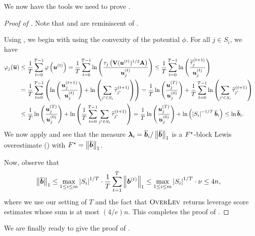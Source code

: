 \documentclass[11pt]{article}
\numberwithin{equation}{section}
\begin{document}
We now have the tools we need to prove .

\begin{proof}[Proof of ]
Note that  and  are reminiscent of \cite[Algorithm 2 and Theorem 4]{jls22}.

Using , we begin with using the convexity of the potential $\phi$. For all $j \in S_i$, we have
\begin{align*}
    \varphi_j(\overline{\bm{u}}) &\le \frac{1}{T}\sum_{t=0}^{T-1} \varphi\left(\bm{u}^{(t)}\right) = \frac{1}{T}\sum_{t=0}^{T-1} \ln\left(\frac{\tau_j\left(\mathbf{V}(\bm{u}^{(t)})^{1/2}\mathbf{A}\right)}{\bm{u}_j^{(t)}}\right) \le \frac{1}{T}\sum_{t=0}^{T-1}\ln\left(\frac{\widetilde{\tau}_j^{(t+1)}}{\bm{u}_j^{(t)}}\right) \\
    &= \frac{1}{T}\sum_{t=0}^{T-1}\left(\ln\left(\frac{\bm{u}_j^{(t+1)}}{\bm{u}_j^{(t)}}\right) + \ln\left(\sum_{j' \in S_i} \widetilde{\tau}_{j'}^{(t+1)}\right)\right) = \frac{1}{T}\ln\left(\frac{\bm{u}_j^{(T)}}{\bm{u}_j^{(0)}}\right) + \frac{1}{T}\sum_{t=0}^{T-1}\ln\left(\sum_{j' \in S_i} \widetilde{\tau}_{j'}^{(t+1)}\right) \\
    &\le \frac{1}{T}\ln\left(\frac{\bm{u}_j^{(T)}}{\bm{u}_j^{(0)}}\right) + \ln\left(\frac{1}{T}\sum_{t=0}^{T-1}\sum_{j' \in S_i} \widetilde{\tau}_{j'}^{(t+1)}\right) = \frac{1}{T}\ln\left(\frac{\bm{u}_j^{(T)}}{\bm{u}_j^{(0)}}\right) + \ln\left(\left\lvert S_i \right\rvert^{-1/T}\overline{\bm{b}}_{i}\right) \le \ln\overline{\bm{b}}_i.
\end{align*}
We now apply  and see that the measure $\bm{\lambda}_i = \overline{\bm{b}}_i/\left\lVert \overline{\bm{b}} \right\rVert_1$ is a $F^{\star}$-block Lewis overestimate () with $F^{\star} = \left\lVert \overline{\bm{b}} \right\rVert_1$.

Now, observe that
\begin{align*}
    \left\lVert \overline{\bm{b}} \right\rVert_1 \le \max_{1 \le i \le m} \left\lvert S_i \right\rvert^{1/T} \cdot \frac{1}{T}\sum_{t=1}^T\left\lVert \bm{b}^{(t)} \right\rVert_1 \le \max_{1 \le i \le m} \left\lvert S_i \right\rvert^{1/T} \cdot \nu \le 4n,
\end{align*}
where we use our setting of $T$ and the fact that $\textsc{OverLev}$ returns leverage score estimates whose sum is at most $(4/e)n$. This completes the proof of .
\end{proof}

We are finally ready to give the proof of .
\end{document}

